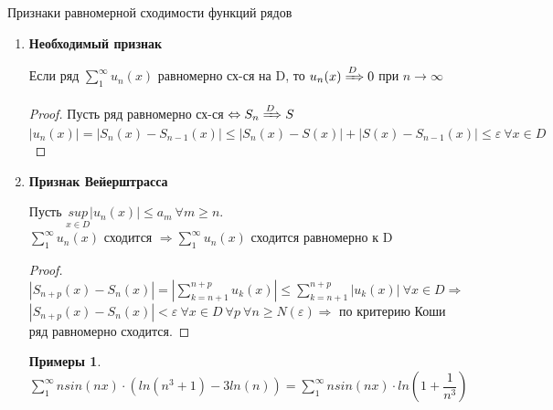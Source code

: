 \documentclass[a4paper, 12pt]{article}
\newtheorem{Examples}{Примеры}
\begin{document}
    \newpage
    Признаки равномерной сходимости функций рядов
    \begin{enumerate}
        \item 
        \textbf{Необходимый признак}
        
        Если ряд $\displaystyle \sum^{\infty}_{1} u_n(x)$ равномерно сх-ся на D,
        то $u_n(x) \xRightarrow{D} 0$ при $n \rightarrow \infty$

        \begin{proof}
            Пусть ряд равномерно сх-ся $\Leftrightarrow S_n \xRightarrow{D} S$\\
            $\left| u_n(x) \right| = \left| S_n(x) - S_{n - 1}(x)\right|
            \le \left| S_n(x) - S(x)\right| + \left| S(x) - S_{n - 1}(x)\right|
            \le \varepsilon \ \forall x \in D$     
        \end{proof} 
        \item
        \textbf{Признак Вейерштрасса}

        Пусть $\underset{x \in D}{sup} \left| u_n(x)\right| \le a_m
        \ \forall m \geqslant n.$\\
        $\displaystyle \sum^{\infty}_{1} u_n(x)$ сходится $\Rightarrow \displaystyle
        \sum^{\infty}_{1} u_n(x)$ сходится равномерно к D

        \begin{proof}
            $\left| S_{n + p}(x) - S_n(x)\right| = \left| \displaystyle
            \sum^{n + p}_{k = n + 1} u_k(x) \right| \leqslant \displaystyle
            \sum^{n + p}_{k = n + 1} \left| u_k(x) \right| \ \forall x \in D \Rightarrow$\\
            $\left| S_{n + p}(x) - S_n(x) \right| < \varepsilon \ \forall x
            \in D \ \forall p \ \forall n \ge N(\varepsilon) \Rightarrow$
            по критерию Коши ряд равномерно сходится.
        \end{proof}
        \begin{Examples}
            $\displaystyle \sum^{\infty}_{1} nsin(nx) \cdot
            (ln(n^3 + 1) - 3ln(n)) = \displaystyle \sum^{\infty}_{1} nsin(nx)
            \cdot ln(1 + \dfrac{1}{n^3})$
        \end{Examples}


\end{enumerate}
\end{document}
